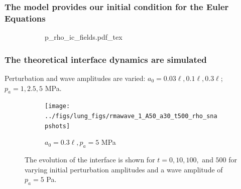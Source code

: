 %
%

\begin{frame}
  \frametitle{The model provides our initial condition for the Euler Equations}
  \begin{center}
    \begin{figure}
      \centering
      \begin{subfigure}{0.7\textwidth}
        \centering%
        \def\svgwidth{\textwidth}%
        {\footnotesize
          {p_rho_ic_fields.pdf_tex}%
        }
      \end{subfigure}
    \end{figure}
  \end{center}

\end{frame}
% 
% 

% 
% 
\begin{frame}
  \frametitle{The theoretical interface dynamics are simulated}
  \vspace*{0.5cm}
  Perturbation and wave amplitudes are varied: $a_0=0.03\ell, 0.1\ell, 0.3\ell$; $p_a=1, 2.5, 5$ MPa.
  \begin{figure}
    \centering
    \begin{subfigure}[b]{0.9\textwidth}
      \texttt{[image: ../figs/lung\_figs/rmawave\_1\_A50\_a30\_t500\_rho\_snapshots]}
      \caption{\label{fig:rho_snapshot_30} $a_0 = 0.3\ell, p_a = 5$ MPa}
    \end{subfigure}
    \caption{The evolution of the interface is shown for $t=0, 10, 100,$
      and $500$ for varying initial perturbation amplitudes and a wave amplitude of $p_a=5$ Pa.}
    \label{fig:rho_snapshots_A50}
  \end{figure}
\end{frame}
%
%
